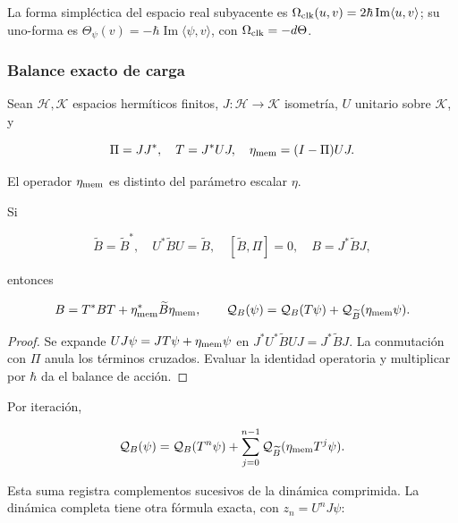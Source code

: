 La forma simpléctica del espacio real subyacente es
\(\Omega_{\rm clk}(u,v)=2\hbar\operatorname{Im}\langle u,v\rangle\);
su uno-forma es
\(\Theta_\psi(v)=-\hbar\operatorname{Im}\langle\psi,v\rangle\),
con \(\Omega_{\rm clk}=-d\Theta\).

\subsubsection{Balance exacto de carga}

Sean \(\mathcal H,\mathcal K\) espacios hermíticos finitos, \(J:\mathcal H\to\mathcal K\) isometría, \(U\) unitario sobre \(\mathcal K\), y

\begin{equation}
\Pi=JJ^*,\quad T=J^*UJ,\quad
\eta_{\rm mem}=(I-\Pi)UJ.
\label{nuc07:eq:15}
\end{equation}

El operador \(\eta_{\rm mem}\) es distinto del parámetro escalar \(\eta\).

\begin{proposition}
Si

\begin{equation}
\widetilde B=\widetilde B^*,\quad U^*\widetilde BU=\widetilde B,
\quad [\widetilde B,\Pi]=0,\quad B=J^*\widetilde BJ,
\label{nuc07:eq:16}
\end{equation}

entonces

\begin{equation}
B=T^*BT+\eta_{\rm mem}^*\widetilde B\eta_{\rm mem},
\qquad
\mathcal Q_B(\psi)=
\mathcal Q_B(T\psi)+\mathcal Q_{\widetilde B}(\eta_{\rm mem}\psi).
\label{nuc07:eq:17}
\end{equation}
\end{proposition}

\begin{proof}
Se expande \(UJ\psi=JT\psi+\eta_{\rm mem}\psi\) en
\(J^*U^*\widetilde BUJ=J^*\widetilde BJ\).
La conmutación con \(\Pi\) anula los términos cruzados. Evaluar la identidad operatoria y multiplicar por \(\hbar\) da el balance de acción.
\end{proof}

Por iteración,

\begin{equation}
\mathcal Q_B(\psi)=\mathcal Q_B(T^n\psi)
+\sum_{j=0}^{n-1}\mathcal Q_{\widetilde B}
(\eta_{\rm mem}T^j\psi).
\label{nuc07:eq:18}
\end{equation}

Esta suma registra complementos sucesivos de la dinámica comprimida. La dinámica completa tiene otra fórmula exacta, con \(z_n=U^nJ\psi\):

